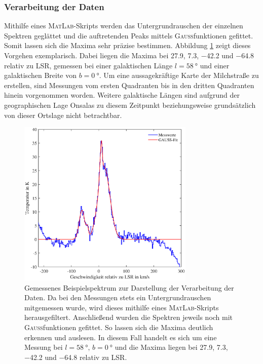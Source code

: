 \subsubsection{Verarbeitung der Daten}
Mithilfe eines \textsc{MatLab}-Skripts werden das Untergrundrauschen der einzelnen Spektren geglättet und die auftretenden Peaks mittels \textsc{Gauß}funktionen gefittet. 
Somit lassen sich die Maxima sehr präzise bestimmen. 
Abbildung \ref{fig:TestBaseline} zeigt dieses Vorgehen exemplarisch. 
Dabei liegen die Maxima bei \SI{27.9}{}, \SI{7.3}{}, \SI{-42.2}{} und \SI{-64.8}{} relativ zu LSR, gemessen bei einer galaktischen Länge $l = \SI{58}{\degree}$ und einer galaktischen Breite von $b = \SI{0}{\degree}$. 
Um eine aussagekräftige Karte der Milchstraße zu erstellen, sind Messungen vom ersten Quadranten bis in den dritten Quadranten hinein vorgenommen worden. 
Weitere galaktische Längen sind aufgrund der geographischen Lage Onsalas zu diesem Zeitpunkt beziehungsweise grundsätzlich von dieser Ortslage nicht betrachtbar.
\begin{figure}[H]
    \centering
    \includegraphics[width= 0.75\textwidth]{plots/TestBaseline.eps}
    \caption[Gemessenes Beispielspektrum zur Darstellung der Verarbeitung der Daten]{Gemessenes Beispielspektrum zur Darstellung der Verarbeitung der Daten. Da bei den Messungen stets ein Untergrundrauschen mitgemessen wurde, wird dieses mithilfe eines \textsc{MatLab}-Skripts herausgefiltert. Anschließend wurden die Spektren jeweils noch mit \textsc{Gauß}funktionen gefittet. So lassen sich die Maxima deutlich erkennen und auslesen. In diesem Fall handelt es sich um eine Messung bei $l = \SI{58}{\degree}, \, b = \SI{0}{\degree}$ und die Maxima liegen bei \SI{27.9}{}, \SI{7.3}{}, \SI{-42.2}{} und \SI{-64.8}{} relativ zu LSR.}
    \label{fig:TestBaseline}
\end{figure}
